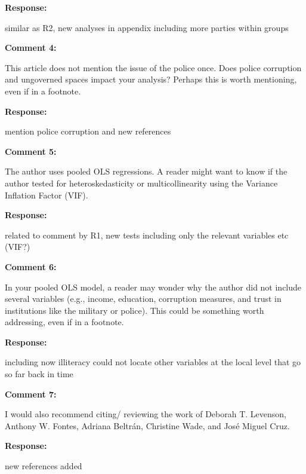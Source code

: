 \documentclass[12pt, a4paper, notitlepage]{article}
\begin{document}
\noindent\textbf{Response:} {}

similar as R2, new analyses in appendix including more parties within groups

\vspace{15pt}
\noindent\textbf{Comment 4:}
\begin{displayquote}
This article does not mention the issue of the police once. Does police corruption and ungoverned spaces impact your analysis? Perhaps this is worth mentioning, even if in a footnote.
\end{displayquote}

\noindent\textbf{Response:} {}

mention police corruption and new references

\vspace{15pt}
\noindent\textbf{Comment 5:}
\begin{displayquote}
The author uses pooled OLS regressions. A reader might want to know if the author tested for heteroskedasticity or multicollinearity using the Variance Inflation Factor (VIF).
\end{displayquote}

\noindent\textbf{Response:} {}

related to comment by R1, new tests including only the relevant variables etc (VIF?)

\vspace{15pt}
\noindent\textbf{Comment 6:}
\begin{displayquote}
In your pooled OLS model, a reader may wonder why the author did not include several variables (e.g., income, education, corruption measures, and trust in institutions like the military or police). This could be something worth addressing, even if in a footnote.
\end{displayquote}

\noindent\textbf{Response:} {}

including now illiteracy
could not locate other variables at the local level that go so far back in time

\vspace{15pt}
\noindent\textbf{Comment 7:}
\begin{displayquote}
I would also recommend citing/ reviewing the work of Deborah T. Levenson, Anthony W. Fontes, Adriana Beltrán, Christine Wade, and José Miguel Cruz.
\end{displayquote}

\noindent\textbf{Response:} {}

new references added

\clearpage


\end{document}
